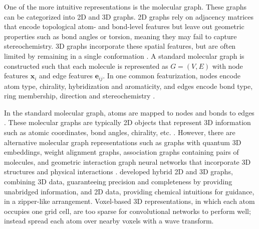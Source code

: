 One of the more intuitive representations is the molecular graph. These graphs can be categorized into 2D and 3D graphs. 2D graphs rely on adjacency matrices that encode topological atom- and bond-level features but leave out geometric properties such as bond angles or torsion, meaning they may fail to capture stereochemistry. 3D graphs incorporate these spatial features, but are often limited by remaining in a single conformation \citep{Zhichun2023}. A standard molecular graph is constructed such that each molecule is represented as $G = (V,E)$ with node features $\mathbf{x}_i$ and edge features $\mathbf{e}_{ij}$. In one common featurization, nodes encode atom type, chirality, hybridization and aromaticity, and edges encode bond type, ring membership, direction and stereochemistry \citep{Zhichun2023}. 

In the standard molecular graph, atoms are mapped to nodes and bonds to edges \citep{David2020}. These molecular graphs are typically 2D objects that represent 3D information such as atomic coordinates, bond angles, chirality, etc. \citep{David2020}. However, there are alternative molecular graph representations such as graphs with quantum 3D embeddings, weight alignment graphs, association graphs containing pairs of molecules, and geometric interaction graph neural networks that incorporate 3D structures and physical interactions \citep{Hnig2022, yan2023, Yang2023GIGN}. \citet{Du2022} developed hybrid 2D and 3D graphs, combining 3D data, guaranteeing precision and completeness by providing unabridged information, and 2D data, providing chemical intuitions for guidance, in a zipper-like arrangement. Voxel-based 3D representations, in which each atom occupies one grid cell, are too sparse for convolutional networks to perform well; \citet{Kuzminykh2018} instead spread each atom over nearby voxels with a wave transform.
      
